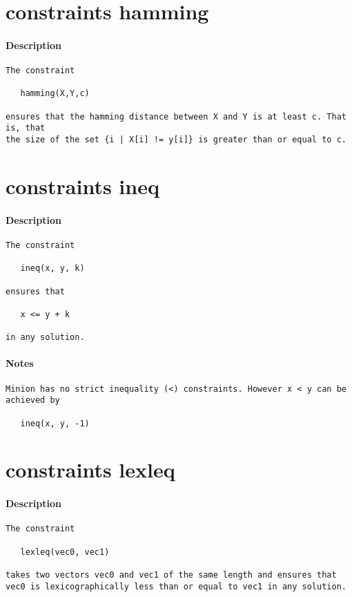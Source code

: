 \section{constraints hamming}
\paragraph{Description}
{\footnotesize
\begin{verbatim}
The constraint

   hamming(X,Y,c)

ensures that the hamming distance between X and Y is at least c. That is, that
the size of the set {i | X[i] != y[i]} is greater than or equal to c.
\end{verbatim}
}
\section{constraints ineq}
\paragraph{Description}
{\footnotesize
\begin{verbatim}
The constraint

   ineq(x, y, k)

ensures that 

   x <= y + k 

in any solution.
\end{verbatim}
}
\paragraph{Notes}
{\footnotesize
\begin{verbatim}
Minion has no strict inequality (<) constraints. However x < y can be
achieved by

   ineq(x, y, -1)
\end{verbatim}
}
\section{constraints lexleq}
\paragraph{Description}
{\footnotesize
\begin{verbatim}
The constraint

   lexleq(vec0, vec1)

takes two vectors vec0 and vec1 of the same length and ensures that
vec0 is lexicographically less than or equal to vec1 in any solution.
\end{verbatim}
}
